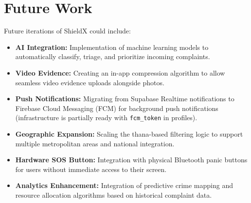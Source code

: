 \documentclass[12pt, a4paper, twoside, openany]{report}
\begin{document}
\section{Future Work}
Future iterations of ShieldX could include:
\begin{itemize}[label={}, itemsep=1em]
    \item \textbf{AI Integration:} Implementation of machine learning models to automatically classify, triage, and prioritize incoming complaints.
    \item \textbf{Video Evidence:} Creating an in-app compression algorithm to allow seamless video evidence uploads alongside photos.
    \item \textbf{Push Notifications:} Migrating from Supabase Realtime notifications to Firebase Cloud Messaging (FCM) for background push notifications (infrastructure is partially ready with \texttt{fcm\_token} in profiles).
    \item \textbf{Geographic Expansion:} Scaling the thana-based filtering logic to support multiple metropolitan areas and national integration.
    \item \textbf{Hardware SOS Button:} Integration with physical Bluetooth panic buttons for users without immediate access to their screen.
    \item \textbf{Analytics Enhancement:} Integration of predictive crime mapping and resource allocation algorithms based on historical complaint data.
\end{itemize}
\end{document}

